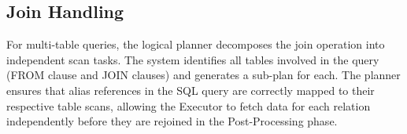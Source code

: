 \subsection{Join Handling}
For multi-table queries, the logical planner decomposes the join operation into independent scan tasks. The system identifies all tables involved in the query (FROM clause and JOIN clauses) and generates a sub-plan for each. The planner ensures that alias references in the SQL query are correctly mapped to their respective table scans, allowing the Executor to fetch data for each relation independently before they are rejoined in the Post-Processing phase.